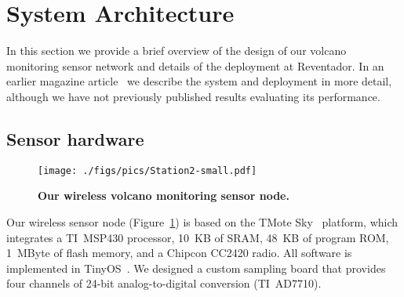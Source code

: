 \section{System Architecture}
\label{sec-design}


In this section we provide a brief overview of the design of our
volcano monitoring sensor network and details of the deployment
at Reventador. In an earlier magazine article~\cite{volcano-ieeeic06}
we describe the system and deployment in more detail, although we have
not previously published results evaluating its performance.

\subsection{Sensor hardware}
\label{sec-hardware}

\begin{figure}[t]
\begin{center}
\texttt{[image: ./figs/pics/Station2-small.pdf]}
\end{center}
\caption{\small {\bf Our wireless volcano monitoring sensor node.}}
\label{fig-station}
\end{figure}


Our wireless sensor node (Figure~\ref{fig-station})
is based on the TMote Sky~\cite{moteiv} 
platform, which integrates a TI~MSP430 processor, 10~KB of SRAM,
48~KB of program ROM, 1~MByte of flash memory, and a Chipcon 
CC2420 radio. All software is implemented in TinyOS~\cite{tinyos-asplos00}.
We designed a custom sampling board that 
provides four channels of 24-bit analog-to-digital 
conversion (TI~AD7710). 

